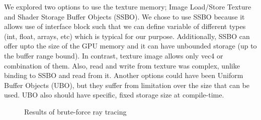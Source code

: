 \documentclass[a4paper,10pt]{article}
\begin{document}
We explored two options to use the texture memory; Image Load/Store Texture and Shader Storage Buffer Objects (SSBO). We chose to use SSBO because it allows use of interface block such that we can define variable of different types (int, float, arrays, etc) which is typical for our purpose. Additionally, SSBO can offer upto the size of the GPU memory and it can have unbounded storage (up to the buffer range bound). In contrast, texture image allows only vec4 or combination of them. Also, read and write from texture was complex, unlike binding to SSBO and read from it. Another options could have been Uniform Buffer Objects (UBO), but they suffer from limitation over the size that can be used. UBO also should have specific, fixed storage size at compile-time. 

\begin{figure}[!tbh]
 \centering     
   
     \caption{Results of brute-force ray tracing}
   \label{fig:brute}
\end{figure} 
   
\end{document}
